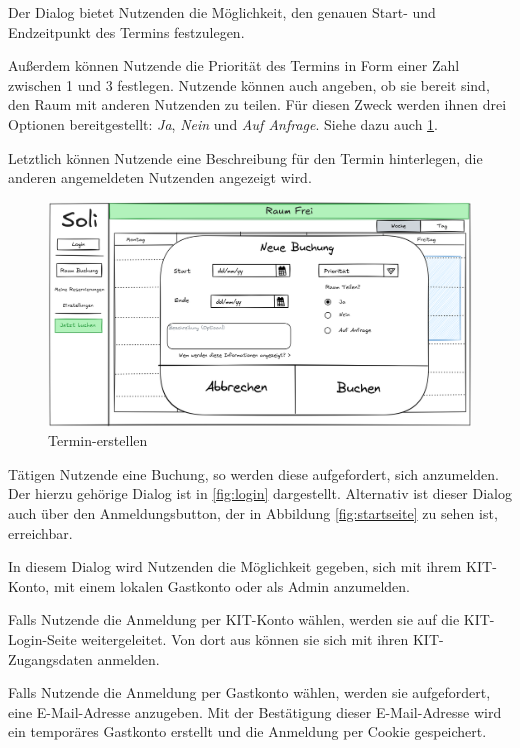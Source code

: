 Der Dialog bietet Nutzenden die Möglichkeit, den genauen Start- und Endzeitpunkt des Termins festzulegen.

Außerdem können Nutzende die Priorität des Termins in Form einer Zahl zwischen 1 und 3 festlegen.
Nutzende können auch angeben, ob sie bereit sind, den Raum mit anderen Nutzenden zu teilen.
Für diesen Zweck werden ihnen drei Optionen bereitgestellt: \textit{Ja}, \textit{Nein} und \textit{Auf Anfrage}.
Siehe dazu auch \ref{fig:buchung}.

Letztlich können Nutzende eine Beschreibung für den Termin hinterlegen, die anderen angemeldeten Nutzenden angezeigt wird.
\clearpage
\begin{figure}[ht]
    \centering
    \includegraphics[scale=0.15]{figures/ui/buchungsdialog}
    \caption{Termin-erstellen}
    \label{fig:buchung}
\end{figure}
\clearpage

Tätigen Nutzende eine Buchung, so werden diese aufgefordert, sich anzumelden.
Der hierzu gehörige Dialog ist in \ref{fig:login} dargestellt.
Alternativ ist dieser Dialog auch über den Anmeldungsbutton, der in Abbildung \ref{fig:startseite} zu sehen ist, erreichbar.

In diesem Dialog wird Nutzenden die Möglichkeit gegeben, sich mit ihrem KIT-Konto, mit einem lokalen Gastkonto oder als Admin anzumelden.

Falls Nutzende die Anmeldung per KIT-Konto wählen, werden sie auf die KIT-Login-Seite weitergeleitet.
Von dort aus können sie sich mit ihren KIT-Zugangsdaten anmelden.

Falls Nutzende die Anmeldung per Gastkonto wählen, werden sie aufgefordert, eine E-Mail-Adresse anzugeben.
Mit der Bestätigung dieser E-Mail-Adresse wird ein temporäres Gastkonto erstellt und die Anmeldung per Cookie gespeichert.

